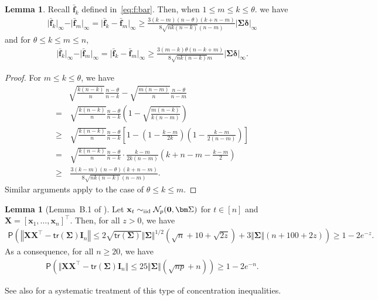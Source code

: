 \documentclass[11pt, a4paper]{article}
\newcommand{\mbf}{\mathbf}
\newcommand{\mc}{\mathcal}
\renewcommand{\l}{\left}
\renewcommand{\r}{\right}
\newcommand{\cp}{\theta}
\newcommand{\tr}[0]{\mathsf{tr}}
\newcommand{\p}{\mathsf{P}}
\newcommand{\iid}{\text{\upshape iid}}
\theoremstyle{definition}
\theoremstyle{definition}
\theoremstyle{definition}
\newtheorem{lem}[thm]{Lemma}
\theoremstyle{definition}
\theoremstyle{definition}
\theoremstyle{remark}
\theoremstyle{definition}
\theoremstyle{definition}
\theoremstyle{definition}
\begin{document}
\begin{lem}
\label{lem:f:bar}
Recall $\bar{\mbf f}_k$ defined in~\eqref{eq:f:bar}.
Then, when $1 \le m \le k \le \cp$. we have
\begin{align*}
\vert \bar{\mbf f}_k \vert_\infty - \vert \bar{\mbf f}_m \vert_\infty  = \vert \bar{\mbf f}_k - \bar{\mbf f}_m \vert_\infty \ge \frac{3(k - m)(n - \cp)(k + n - m)}{8\sqrt{n k (n - k)} (n - m)} \vert \bm\Sigma \bm\delta \vert_\infty
\end{align*}
and for $\cp \le k \le m \le n$,
\begin{align*}
\vert \bar{\mbf f}_k \vert_\infty - \vert \bar{\mbf f}_m \vert_\infty = \vert \bar{\mbf f}_k - \bar{\mbf f}_m \vert_\infty \ge \frac{3(m - k) \cp (n - k + m)}{8\sqrt{n k (n - k)} m} \vert \bm\Sigma \bm\delta \vert_\infty.
\end{align*}
\end{lem}

\begin{proof}
For $m \le k \le \cp$, we have
\begin{align*}
& \sqrt{\frac{k (n - k)}{n}} \frac{n - \cp}{n - k} - \sqrt{\frac{m (n - m)}{n}} \frac{n - \cp}{n - m} 
\\
=& \, \sqrt{\frac{k (n - k)}{n}} \frac{n - \cp}{n - k} \l( 1 - \sqrt{\frac{m (n - k)}{k (n - m)}} \r)
\\
\ge& \, \sqrt{\frac{k (n - k)}{n}} \frac{n - \cp}{n - k} \l[ 1 - \l(1 - \frac{k - m}{2k} \r) \l(1 - \frac{k - m}{2(n - m)} \r) \r] 
\\
=& \, \sqrt{\frac{k (n - k)}{n}} \frac{n - \cp}{n - k} \cdot \frac{k - m}{2k (n - m)} \l( k + n - m - \frac{k - m}{2} \r)
\\
\ge& \, \frac{3(k - m)(n - \cp)(k + n - m)}{8\sqrt{n k (n - k)} (n - m)}.
\end{align*}
Similar arguments apply to the case of $\cp \le k \le m$.
\end{proof}

\begin{lem}[Lemma~B.1 of \citealp{VeGa18}] 
\label{lem:op:xx}
Let $\mbf x_t \sim_{\iid} \mc N_p(\mbf 0, \bm \Sigma)$ for $t \in[n]$ and $ \mbf X = [\mbf x_1, \ldots, \mbf x_n]^\top$. Then, for all $z > 0$, we have
\begin{align*}
\p\l( \l\Vert \mbf X\mbf X^\top - \tr(\bm\Sigma)\mbf I_n \r\Vert \le 2 \sqrt{\tr(\bm\Sigma)} \Vert \bm\Sigma \Vert^{1/2} (\sqrt n + 10 + \sqrt{2z}) + 3 \Vert \bm\Sigma \Vert(n + 100 + 2z) \r) \ge 1 - 2 e^{-z}.
\end{align*}
As a consequence, for all $n \ge 20$, we have
\begin{align*}
\p\l( \Vert \mbf X\mbf X^\top - \tr(\bm\Sigma)\mbf I_n \Vert \le 25 \Vert \bm\Sigma \Vert (\sqrt{np} + n) \r) \ge 1 - 2e^{-n}.
\end{align*}
\end{lem}
See also \citet{KoLo17} for a systematic treatment of this type of concentration inequalities. 
\end{document}
